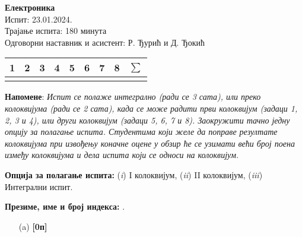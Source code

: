 \documentclass[10pt, a4paper, twoside]{article}
\begin{document}
\noindent
\begin{minipage}[t]{0.5\textwidth}
\begin{flushleft}
\vspace*{0pt}
{\large \textbf{Електроника}} \\[2mm]
Испит: 23.01.2024. \\
Трајање испита: 180 минута \\
Одговорни наставник и асистент: 
Р. Ђурић и Д. Ђокић
\end{flushleft}
\end{minipage}
\hfill
\begin{minipage}[t]{0.5\textwidth}
\vspace*{0pt}
\begin{tabularx}{\textwidth}{|X|X|X|X||X|X|X|X|||X|} 
\hline
1 & 2 & 3 & 4 & 5 & 6 & 7 & 8 & $\sum$ \\
\hline \hline 
\begin{minipage}{0.2\textwidth}
\vspace*{10mm}
\end{minipage}
& & & & & & & &   \\
\hline
\end{tabularx}
\end{minipage}

\vspace*{2.5mm}

\noindent
\textbf{Напомене}: 
\textit{Испит се полаже интегрално (ради се 3 сата), или преко колоквијума (ради се 2 сата), када се може радити први
колоквијум (задаци 1, 2, 3 и 4), или други колоквијум (задаци 5, 6, 7 и 8). 
Заокружити тачно једну опцију за полагање испита.
Студентима који желе да поправе резултате колоквијума 
при извођењу коначне оцене
у обзир ће се узимати већи број поена између колоквијума 
и дела испита који се односи на
колоквијум. 
} \vspace*{2mm}

\noindent
\textbf{Опција за полагање испита:} 
\hfill
(\textit{i}) I колоквијум, 
\hfill
(\textit{ii}) II колоквијум,
\hfill
(\textit{iii}) Интегрални испит.

\vspace*{5mm}

\noindent
\textbf{Презиме, име и број индекса:}
\hrulefill.

\vspace*{5mm}
\noindent
{}
\begin{minipage}[t]{0.93\textwidth}
\begin{enumerate}
\itemsep0pt
\item[(a)] \textbf{[0п]}
\end{enumerate}
\end{minipage}
\end{document}
